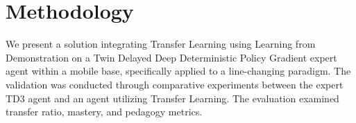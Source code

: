\section{Methodology}
We present a solution integrating Transfer Learning using Learning from Demonstration on a Twin Delayed Deep Deterministic Policy Gradient expert agent within a mobile base, specifically applied to a line-changing paradigm. The validation was conducted through comparative experiments between the expert TD3 agent and an agent utilizing Transfer Learning. The evaluation examined transfer ratio, mastery, and pedagogy metrics.